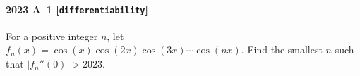 \paragraph{2023 A--1 \textnormal{[\texttt{differentiability}]}}
For a positive integer $n$, let $f_n(x) = \cos(x) \cos(2x) \cos(3x) \cdots \cos(nx)$. Find the smallest $n$ such that $|f_n''(0)| > 2023$.
